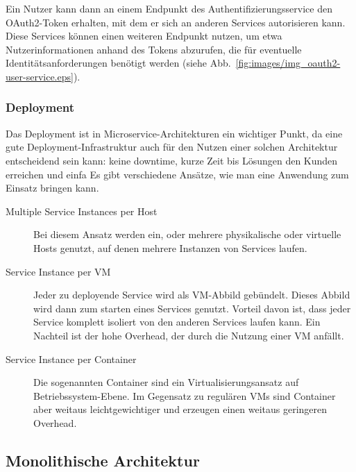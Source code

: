 \documentclass[12pt,a4paper,bibliography=totocnumbered,listof=totocnumbered]{scrartcl}
\begin{document}
Ein Nutzer kann dann an einem Endpunkt des Authentifizierungsservice den OAuth2-Token erhalten, mit dem er sich an anderen Services autorisieren kann. Diese Services können einen weiteren Endpunkt nutzen, um etwa Nutzerinformationen anhand des Tokens abzurufen, die für eventuelle Identitätsanforderungen benötigt werden (siehe Abb.~\ref{fig:images/img_oauth2-user-service.eps}).


\subsubsection{Deployment}

Das Deployment ist in Microservice-Architekturen ein wichtiger Punkt, da eine gute Deployment-Infrastruktur auch für den Nutzen einer solchen Architektur entscheidend sein kann: keine downtime, kurze Zeit bis Lösungen den Kunden erreichen und einfa Es gibt verschiedene Ansätze, wie man eine Anwendung zum Einsatz bringen kann\cite{richardsondeploy}.

\begin{description}
	\item[Multiple Service Instances per Host] Bei diesem Ansatz werden ein, oder mehrere physikalische oder virtuelle Hosts genutzt, auf denen mehrere Instanzen von Services laufen.
	
	\item[Service Instance per \ac{VM}] Jeder zu deployende Service wird als \ac{VM}-Abbild gebündelt. Dieses Abbild wird dann zum starten eines Services genutzt. Vorteil davon ist, dass jeder Service komplett isoliert von den anderen Services laufen kann. Ein Nachteil ist der hohe Overhead, der durch die Nutzung einer \ac{VM} anfällt.
	
	\item[Service Instance per Container] Die sogenannten Container sind ein Virtualisierungsansatz auf Betriebssystem-Ebene. Im Gegensatz zu regulären \acp{VM} sind Container aber weitaus leichtgewichtiger und erzeugen einen weitaus geringeren Overhead.
\end{description}

\subsection{Monolithische Architektur}\label{ch:mon-arch}
\end{document}
